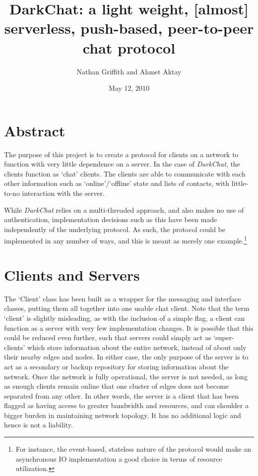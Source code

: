 \documentclass[11pt]{article}
\title{DarkChat: a light weight, [almost] serverless, push-based, peer-to-peer chat protocol}
\author{Nathan Griffith and Ahmet Aktay}
\date{May 12, 2010}
\begin{document}
\maketitle %

\section{Abstract}

The purpose of this project is to create a protocol for clients on a network to function with very little dependence on a server. In the case of \emph{DarkChat}, the clients function as `chat' clients. The clients are able to communicate with each other information such as `online'/`offline' state and lists of contacts, with little-to-no interaction with the server.

While \emph{DarkChat} relies on a multi-threaded approach, and also makes no use of authentication, implementation decisions such as this have been made independently of the underlying protocol. As such, the protocol could be implemented in any number of ways, and this is meant as merely one example.\footnote{For instance, the event-based, stateless nature of the protocol would make an asynchronous IO implementation a good choice in terms of resource utilization.}

\section{Clients and Servers}

The `Client' class has been built as a wrapper for the messaging and interface classes, putting them all together into one usable chat client. Note that the term `client' is slightly misleading, as with the inclusion of a simple flag, a client can function as a server with very few implementation changes. It is possible that this could be reduced even further, such that servers could simply act as `super-clients' which store information about the entire network, instead of about only their nearby edges and nodes.
In either case, the only purpose of the server is to act as a secondary or backup repository for storing information about the network. Once the network is fully operational, the server is not needed, as long as enough clients remain online that one cluster of edges does not become separated from any other. In other words, the server is a client that has been flagged as having access to greater bandwidth and resources, and can shoulder a bigger burden in maintaining network topology. It has no additional logic and hence is not a liability.
\end{document}
